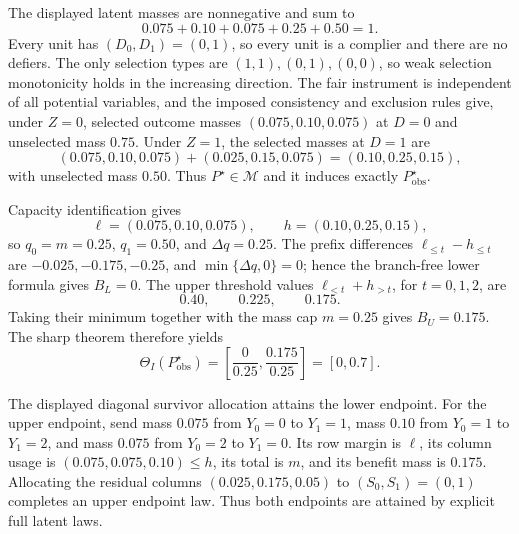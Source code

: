 The displayed latent masses are nonnegative and sum to
\[
0.075+0.10+0.075+0.25+0.50=1.
\]
Every unit has \((D_0,D_1)=(0,1)\), so every unit is a complier and there are no defiers.  The only selection types are \((1,1),(0,1),(0,0)\), so weak selection monotonicity holds in the increasing direction.  The fair instrument is independent of all potential variables, and the imposed consistency and exclusion rules give, under \(Z=0\), selected outcome masses \((0.075,0.10,0.075)\) at \(D=0\) and unselected mass \(0.75\).  Under \(Z=1\), the selected masses at \(D=1\) are
\[
(0.075,0.10,0.075)+(0.025,0.15,0.075)=(0.10,0.25,0.15),
\]
with unselected mass \(0.50\).  Thus \(P^{\star}\in\mathcal M\) and it induces exactly \(P_{\mathrm{obs}}^{\star}\).

Capacity identification gives
\[
\ell=(0.075,0.10,0.075),\qquad h=(0.10,0.25,0.15),
\]
so \(q_0=m=0.25\), \(q_1=0.50\), and \(\Delta q=0.25\).  The prefix differences \(\ell_{\le t}-h_{\le t}\) are \(-0.025,-0.175,-0.25\), and \(\min\{\Delta q,0\}=0\); hence the branch-free lower formula gives \(B_L=0\).  The upper threshold values \(\ell_{<t}+h_{>t}\), for \(t=0,1,2\), are
\[
0.40,\qquad0.225,\qquad0.175.
\]
Taking their minimum together with the mass cap \(m=0.25\) gives \(B_U=0.175\).  The sharp theorem therefore yields
\[
\Theta_I(P_{\mathrm{obs}}^{\star})=\left[\frac0{0.25},\frac{0.175}{0.25}\right]=[0,0.7].
\]

The displayed diagonal survivor allocation attains the lower endpoint.  For the upper endpoint, send mass \(0.075\) from \(Y_0=0\) to \(Y_1=1\), mass \(0.10\) from \(Y_0=1\) to \(Y_1=2\), and mass \(0.075\) from \(Y_0=2\) to \(Y_1=0\).  Its row margin is \(\ell\), its column usage is \((0.075,0.075,0.10)\le h\), its total is \(m\), and its benefit mass is \(0.175\).  Allocating the residual columns \((0.025,0.175,0.05)\) to \((S_0,S_1)=(0,1)\) completes an upper endpoint law.  Thus both endpoints are attained by explicit full latent laws.